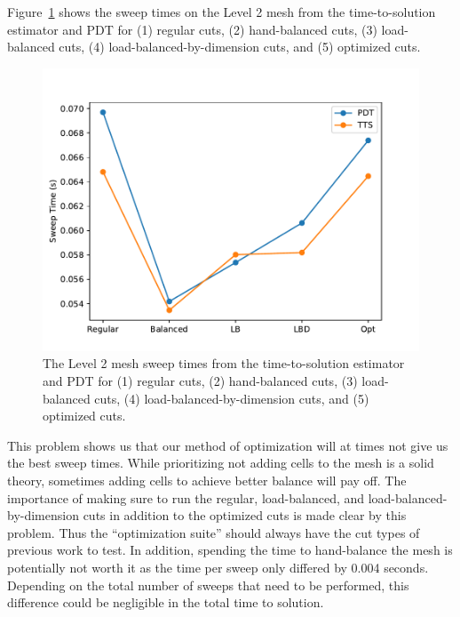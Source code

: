 Figure~\ref{level2_opt} shows the sweep times on the Level 2 mesh from the time-to-solution estimator and PDT for (1) regular cuts, (2) hand-balanced cuts, (3) load-balanced cuts, (4) load-balanced-by-dimension cuts, and (5) optimized cuts.
\begin{figure}[H]
\centering
\includegraphics{../../figures/level2_sweep_comp.pdf}
\caption{The Level 2 mesh sweep times from the time-to-solution estimator and PDT for (1) regular cuts, (2) hand-balanced cuts, (3) load-balanced cuts, (4) load-balanced-by-dimension cuts, and (5) optimized cuts. }
\label{level2_opt}
\end{figure}
This problem shows us that our method of optimization will at times not give us the best sweep times.
While prioritizing not adding cells to the mesh is a solid theory, sometimes adding cells to achieve better balance will pay off.
The importance of making sure to run the regular, load-balanced, and load-balanced-by-dimension cuts in addition to the optimized cuts is made clear by this problem.
Thus the ``optimization suite'' should always have the cut types of previous work to test.
In addition, spending the time to hand-balance the mesh is potentially not worth it as the time per sweep only differed by 0.004 seconds.
Depending on the total number of sweeps that need to be performed, this difference could be negligible in the total time to solution.

